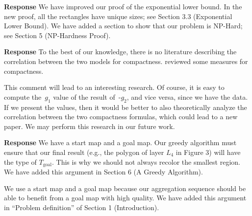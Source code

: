 \documentclass[a4paper,twoside,11pt]{reviewresponse}
\begin{document}
\textbf{Response}
We have improved our proof of the exponential lower bound.
In the new proof, all the rectangles have unique sizes;
see Section 3.3 (Exponential Lower Bound).
We have added a section to show that our problem is NP-Hard;
see Section 5 (NP-Hardness Proof).




\textbf{Response} 
To the best of our knowledge, 
there is no literature describing 
the correlation between the two models for compactness.
\textcite{Li2013Compactness} reviewed some measures for compactness.

This comment will lead to an interesting research.
Of course, it is easy to compute the~$g_1$ value of the result of~\Astar-$g_2$,
and vice versa, since we have the data.
If we present the values, then it would be better to also theoretically analyze the correlation between the two compactness formulas,
which could lead to a new paper.
We may perform this research in our future work.




\textbf{Response} We have a start map and a goal map.
Our greedy algorithm must ensure that 
our final result (e.g., the polygon of layer $L_4$ in
Figure 3) will have the type of $T_\mathrm{goal}$.
This is why we should not always recolor the smallest region.
We have added this argument in Section 6 (A Greedy Algorithm).

We use a start map and a goal map because 
our aggregation sequence should be able to 
benefit from a goal map with high quality.
We have added this argument 
in ``Problem definition'' of Section 1 (Introduction).
\end{document}
